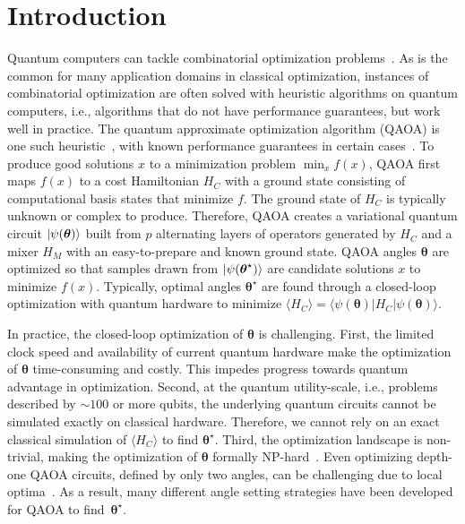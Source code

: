 \documentclass[twocolumn,
english,
aps,
pra,
10pt,
longbibliography,
superscriptaddress,
amsmath,
amssymb,
floatfix
]{revtex4-2}
\begin{document}
\section{Introduction}\label{sec:intro}

Quantum computers can tackle combinatorial optimization problems~\cite{Abbas2024}. As is the common for many application domains in classical optimization,   instances of combinatorial optimization are often  solved with heuristic algorithms on quantum computers, i.e., algorithms that do not have performance guarantees, but work well in practice.
The quantum approximate optimization algorithm (QAOA) is one such heuristic~\cite{Farhi2014}, with known performance guarantees in certain cases~\cite{Farhi2014, Wurtz2021a}.
To produce good solutions $x$ to a minimization problem $\min_x f(x)$, QAOA first maps $f(x)$ to a cost Hamiltonian $H_C$ with a ground state consisting of computational basis states that minimize $f$.
The ground state of $H_C$ is typically unknown or complex to produce. 
Therefore, QAOA creates a variational quantum circuit $\ket{\psi(\boldsymbol{\theta})}$ built from $p$ alternating layers of operators generated by $H_C$ and a mixer $H_M$ with an easy-to-prepare and known ground state.
QAOA angles $\boldsymbol{\theta}$ are optimized so that samples drawn from $\ket{\psi(\boldsymbol{\theta}^\star)}$ are candidate solutions $x$ to minimize $f(x)$.
Typically, optimal angles $\boldsymbol{\theta}^\star$ are found through a closed-loop optimization with quantum hardware to minimize $\langle H_C\rangle=\langle\psi(\boldsymbol{\theta})|H_C|\psi(\boldsymbol{\theta})\rangle$.

In practice, the closed-loop optimization of $\boldsymbol{\theta}$ is challenging.
First, the limited clock speed and availability of current quantum hardware make the optimization of $\boldsymbol{\theta}$ time-consuming and costly.
This impedes progress towards quantum advantage in optimization.
Second, at the quantum utility-scale, i.e., problems described by $\sim100$ or more qubits, the underlying quantum circuits cannot be simulated exactly on classical hardware.
Therefore, we cannot rely on an exact classical simulation of $\langle H_C\rangle$ to find $\boldsymbol{\theta}^\star$.
Third, the optimization landscape is non-trivial, making the optimization of $\boldsymbol{\theta}$ formally NP-hard~\cite{Bittel_2021}.
Even optimizing depth-one QAOA circuits, defined by only two angles, can be challenging due to local optima~\cite{Vijendran2025}.
As a result, many different angle setting strategies have been developed for QAOA to find~$\boldsymbol{\theta}^\star$.
\end{document}
